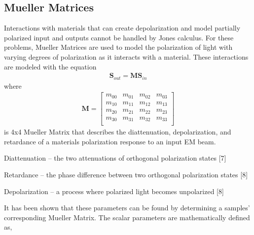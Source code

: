 \subsection{Mueller Matrices}
Interactions with materials that can create depolarization and model partially polarized input and outputs cannot be handled by Jones calculus.  For these problems, Mueller Matrices are used to model the polarization of light with varying degrees of polarization as it interacts with a material.  These interactions are modeled with the equation
\begin{align}
    \mathbf{S}_{out} = \mathbf{M}\mathbf{S}_{in}
\end{align}
%
where
%
\begin{align}
    \mathbf{M} =
    \begin{bmatrix}
        m_{00} & m_{01} & m_{02} & m_{03} \\
        m_{10} & m_{11} & m_{12} & m_{13} \\
        m_{20} & m_{21} & m_{22} & m_{23} \\
        m_{30} & m_{31} & m_{32} & m_{33} \\
    \end{bmatrix}
\end{align}
%
is 4x4 Mueller Matrix that describes the diattenuation, depolarization, and retardance of a materials polarization response to an input EM beam.

Diattenuation – the two attenuations of orthogonal polarization states [7]

Retardance – the phase difference between two orthogonal polarization states [8]

Depolarization – a process where polarized light becomes unpolarized [8]

It has been shown that these parameters can be found by determining a samples’ corresponding Mueller Matrix. The scalar parameters are mathematically defined as,
\begin{align}
\end{align}

